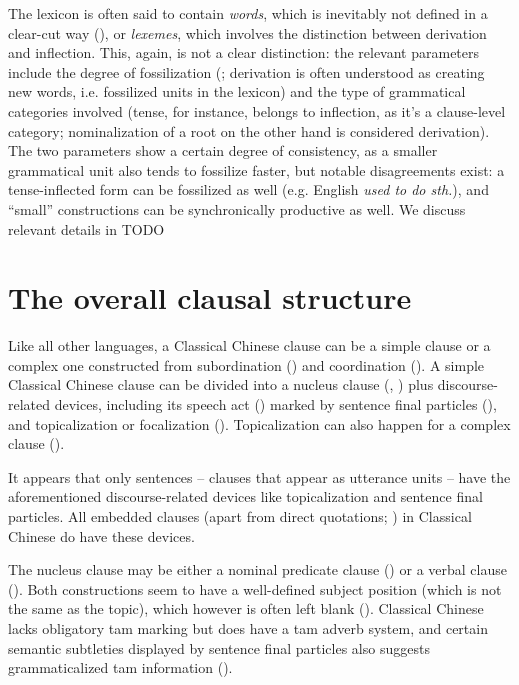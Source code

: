 \documentclass[UTF8, a4paper, oneside, scheme=plain, 12pt]{ctexrep}
\newcommand*{\term}[1]{\emph{#1}}
\newcommand{\form}[1]{\emph{#1}}
\begin{document}
The lexicon is often said to contain \term{words}, which is inevitably not defined in a clear-cut way (), 
or \term{lexemes}, which involves the distinction between derivation and inflection.
This, again, is not a clear distinction:
the relevant parameters include the degree of fossilization (; derivation is often understood as creating new words, i.e. fossilized units in the lexicon)
and the type of grammatical categories involved 
(tense, for instance, belongs to inflection, as it's a clause-level category; nominalization of a root on the other hand is considered derivation).
The two parameters show a certain degree of consistency,
as a smaller grammatical unit also tends to fossilize faster, but notable disagreements exist:
a tense-inflected form can be fossilized as well (e.g. English \form{used to do sth.}),
and ``small'' constructions can be synchronically productive as well.
We discuss relevant details in TODO

\section{The overall clausal structure}\label{sec:grammatical.clause}

Like all other languages, a Classical Chinese clause can be a simple clause
or a complex one constructed from subordination ()
and coordination ().
A simple Classical Chinese clause can be divided into a nucleus clause (, )
plus discourse-related devices,
including its speech act () marked by sentence final particles (),
and topicalization or focalization ().
Topicalization can also happen for a complex clause ().

It appears that only sentences -- clauses that appear as utterance units -- have the aforementioned discourse-related devices like topicalization and sentence final particles.
All embedded clauses (apart from direct quotations; ) in Classical Chinese do have these devices.

The nucleus clause may be either a nominal predicate clause ()
or a verbal clause ().
Both constructions seem to have a well-defined subject position (which is not the same as the topic),
which however is often left blank ().
Classical Chinese lacks obligatory \ac{tam} marking but does have a \ac{tam} adverb system, and certain semantic subtleties displayed by sentence final particles also suggests grammaticalized \ac{tam} information ().
\end{document}
